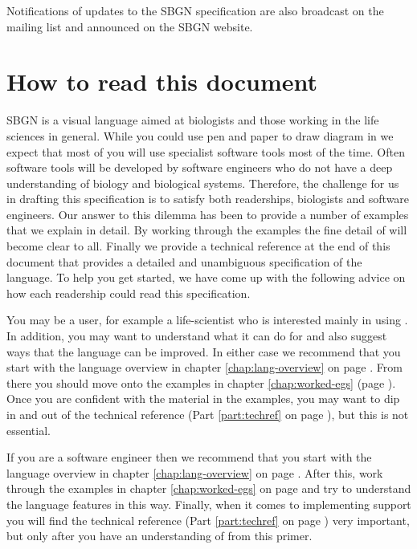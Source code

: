 Notifications of updates to the SBGN specification are also broadcast on 
the mailing list and announced on the SBGN website.

\section{How to read this document}

SBGN is a visual language aimed at biologists and those working in
the life sciences in general. While you could use pen and paper to
draw diagram in \PD we expect that most of you will use specialist
software tools most of the time. Often software tools will be
developed by software engineers who do not have a deep understanding
of biology and biological systems. Therefore, the challenge for us in
drafting this specification is to satisfy both readerships, biologists
and software engineers. Our answer to this dilemma has been to provide
a number of examples that we explain in detail. By working through the
examples the fine detail of \PD will become clear to all. Finally we
provide a technical reference at the end of this document that
provides a detailed and unambiguous specification of the language. To
help you get started, we have come up with the following
advice on how each readership could read this specification.

You may be a user, for example a life-scientist who is interested
mainly in using \PDl. In addition, you may want to understand what it
can do for and also suggest ways that the language can be improved. In
either case we recommend that you start with the language overview in
chapter \ref{chap:lang-overview} on page
\pageref{chap:lang-overview}. From there you should move onto the
examples in chapter \ref{chap:worked-egs} (page
\pageref{chap:worked-egs}). Once you are confident with the material
in the examples, you may want to dip in and out of the technical
reference (Part \ref{part:techref} on page
\pageref{part:techref}), but this is not essential.

If you are a software engineer then we recommend that you start with
the language overview in chapter \ref{chap:lang-overview} on page
\pageref{chap:lang-overview}. After this, work through the examples in
chapter \ref{chap:worked-egs} on page \pageref{chap:worked-egs} and
try to understand the language features in this way. Finally, when it
comes to implementing \PDl support you will find the technical
reference (Part \ref{part:techref} on page \pageref{part:techref})
very important, but only after you have an understanding of \PD
from this primer.




